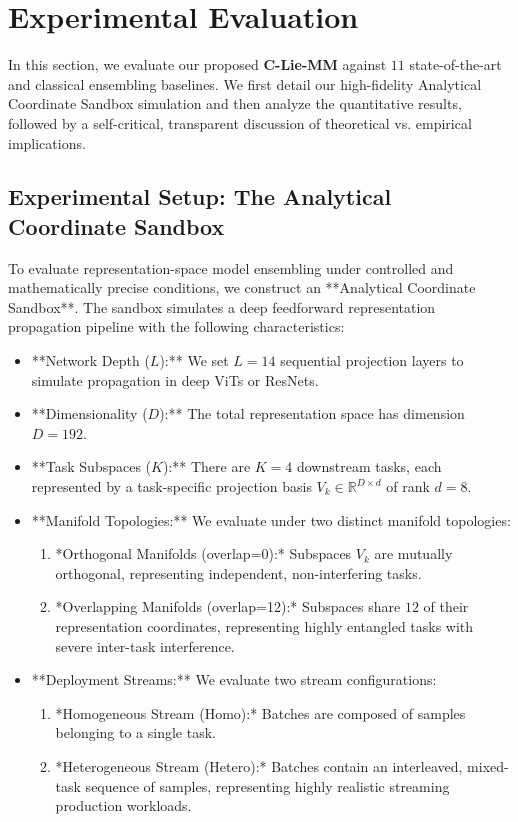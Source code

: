 \section{Experimental Evaluation}
\label{sec:experiments}

In this section, we evaluate our proposed \textbf{C-Lie-MM} against $11$ state-of-the-art and classical ensembling baselines. We first detail our high-fidelity Analytical Coordinate Sandbox simulation and then analyze the quantitative results, followed by a self-critical, transparent discussion of theoretical vs. empirical implications.

\subsection{Experimental Setup: The Analytical Coordinate Sandbox}
To evaluate representation-space model ensembling under controlled and mathematically precise conditions, we construct an **Analytical Coordinate Sandbox**. The sandbox simulates a deep feedforward representation propagation pipeline with the following characteristics:
\begin{itemize}
    \item **Network Depth ($L$):** We set $L = 14$ sequential projection layers to simulate propagation in deep ViTs or ResNets.
    \item **Dimensionality ($D$):** The total representation space has dimension $D = 192$.
    \item **Task Subspaces ($K$):** There are $K = 4$ downstream tasks, each represented by a task-specific projection basis $V_k \in \mathbb{R}^{D \times d}$ of rank $d = 8$.
    \item **Manifold Topologies:** We evaluate under two distinct manifold topologies:
    \begin{enumerate}
        \item *Orthogonal Manifolds (overlap=0):* Subspaces $V_k$ are mutually orthogonal, representing independent, non-interfering tasks.
        \item *Overlapping Manifolds (overlap=12):* Subspaces share $12$ of their representation coordinates, representing highly entangled tasks with severe inter-task interference.
    \end{enumerate}
    \item **Deployment Streams:** We evaluate two stream configurations:
    \begin{enumerate}
        \item *Homogeneous Stream (Homo):* Batches are composed of samples belonging to a single task.
        \item *Heterogeneous Stream (Hetero):* Batches contain an interleaved, mixed-task sequence of samples, representing highly realistic streaming production workloads.
    \end{enumerate}
\end{itemize}


